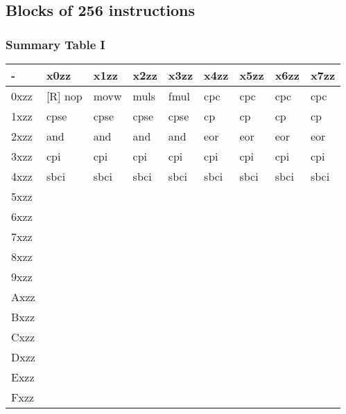 \documentclass{beamer}
\begin{document}
\subsection{Blocks of 256 instructions}
\begin{frame}
\frametitle{Summary Table I}
\small
\begin{center}
    \begin{tabular}{| l | l | l | l | l | l | l | l | l |}
    \hline
    - & x0zz & x1zz & x2zz & x3zz & x4zz & x5zz & x6zz & x7zz \\    \hline
    0xzz & [R] nop & movw & muls & fmul & cpc & cpc & cpc  & cpc \\ \hline
    1xzz & cpse & cpse & cpse & cpse & cp & cp & cp & cp \\ \hline
    2xzz & and & and & and & and & eor & eor & eor & eor \\ \hline
    3xzz & cpi & cpi & cpi & cpi & cpi & cpi & cpi & cpi \\ \hline
    4xzz & sbci & sbci & sbci & sbci & sbci & sbci & sbci & sbci \\ \hline
    5xzz & & & & & & & & \\ \hline
    6xzz & & & & & & & & \\ \hline
    7xzz & & & & & & & & \\ \hline
    8xzz & & & & & & & & \\ \hline
    9xzz & & & & & & & & \\ \hline
    Axzz & & & & & & & & \\ \hline
    Bxzz & & & & & & & & \\ \hline
    Cxzz & & & & & & & & \\ \hline
    Dxzz & & & & & & & & \\ \hline
    Exzz & & & & & & & & \\ \hline
    Fxzz & & & & & & & & \\ \hline
    \end{tabular}
\end{center}
\end{frame}
\end{document}
